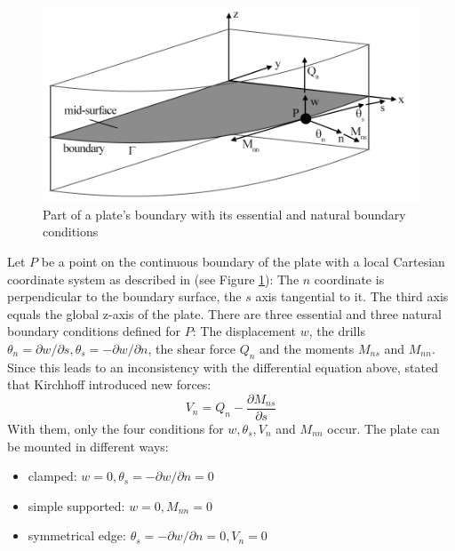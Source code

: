   \begin{figure}[htbp] %
  	\centering
  	\includegraphics[width=0.97\linewidth]{figures/plate_boundary}
  	\caption{Part of a plate's boundary with its essential and natural boundary conditions}
  	\label{fig:plate_boundary}
  \end{figure}
  Let $P$ be a point on the continuous boundary of the plate with a local Cartesian coordinate system as described in \cite{steinke2005finite} (see Figure \ref{fig:plate_boundary}): The $n$ coordinate is perpendicular to the boundary surface, the $s$ axis tangential to it. The third axis equals the global z-axis of the plate. There are three essential and three natural boundary conditions defined for $P$: The displacement $w$, the drills $\theta_n = \partial w/\partial s, \theta_s = -\partial w/\partial n$, the shear force $Q_n$ and the moments $M_{ns}$ and $M_{nn}$. Since this leads to an inconsistency with the differential equation above, \cite{steinke2005finite} stated that Kirchhoff introduced new forces:
  \begin{equation}
  V_n = Q_n - \frac{\partial M_{ns}}{\partial s}
  \end{equation}
  With them, only the four conditions for $w, \theta_s, V_n$ and $M_{nn}$ occur.
  The plate can be mounted in different ways:
  \begin{itemize}
  	\item clamped: $w = 0, \theta_s = -\partial w/\partial n = 0$
  	\item simple supported: $w = 0, M_{nn} = 0$
  	\item symmetrical edge: $\theta_s = -\partial w/\partial n = 0, V_n = 0$
  \end{itemize}

